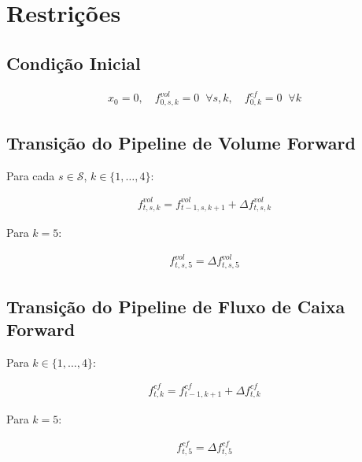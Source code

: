 \documentclass{article}
\begin{document}
\section{Restrições}

\subsection{Condição Inicial}

\begin{align}
    x_0 = 0, \quad f^{vol}_{0,s,k} = 0 \;\; \forall s,k, \quad f^{cf}_{0,k} = 0 \;\; \forall k
\end{align}

\subsection{Transição do Pipeline de Volume Forward}

Para cada $s \in \mathcal{S}$, $k \in \{1,\ldots,4\}$:

\begin{align}
    f^{vol}_{t,s,k} = f^{vol}_{t-1,s,k+1} + \Delta f^{vol}_{t,s,k}
\end{align}

Para $k = 5$:

\begin{align}
    f^{vol}_{t,s,5} = \Delta f^{vol}_{t,s,5}
\end{align}

\subsection{Transição do Pipeline de Fluxo de Caixa Forward}

Para $k \in \{1,\ldots,4\}$:

\begin{align}
    f^{cf}_{t,k} = f^{cf}_{t-1,k+1} + \Delta f^{cf}_{t,k}
\end{align}

Para $k = 5$:

\begin{align}
    f^{cf}_{t,5} = \Delta f^{cf}_{t,5}
\end{align}
\end{document}
